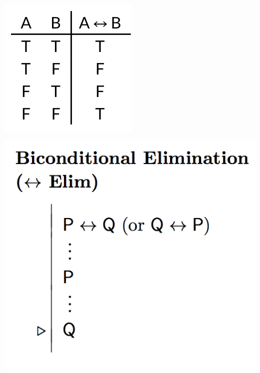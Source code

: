 \documentclass[12pt]{extarticle}
\begin{document}
\begin{multicols*}{3}
\begin{center}
\includegraphics[scale=0.3]{img/tt_biconditional.png}
\end{center}
\begin{center}
\includegraphics[scale=0.3]{img/rule_biconditional_elim.png}
\end{center}
\begin{center}

\end{center}
\end{multicols*}
\end{document}
